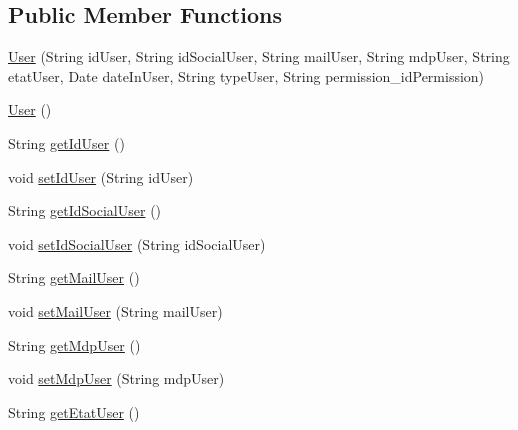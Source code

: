 \subsection*{Public Member Functions}
\begin{DoxyCompactItemize}
\item 
\hyperlink{classcom_1_1ecetech_1_1bti4_1_1itproject_1_1classified_1_1beans_1_1_user_a1c64ba162d05851b1816cdae8f1d2e84}{User} (String id\+User, String id\+Social\+User, String mail\+User, String mdp\+User, String etat\+User, Date date\+In\+User, String type\+User, String permission\+\_\+id\+Permission)
\item 
\hyperlink{classcom_1_1ecetech_1_1bti4_1_1itproject_1_1classified_1_1beans_1_1_user_a5c8183b739fb3263329e53fb5b7cbb04}{User} ()
\item 
String \hyperlink{classcom_1_1ecetech_1_1bti4_1_1itproject_1_1classified_1_1beans_1_1_user_a188f7ab8312cde857251e04343459b90}{get\+Id\+User} ()
\item 
void \hyperlink{classcom_1_1ecetech_1_1bti4_1_1itproject_1_1classified_1_1beans_1_1_user_a4685ee08d69755a377312006de72c863}{set\+Id\+User} (String id\+User)
\item 
String \hyperlink{classcom_1_1ecetech_1_1bti4_1_1itproject_1_1classified_1_1beans_1_1_user_add20572896528d7e7db3e7d45f1dbf0b}{get\+Id\+Social\+User} ()
\item 
void \hyperlink{classcom_1_1ecetech_1_1bti4_1_1itproject_1_1classified_1_1beans_1_1_user_abd30ec28ff6993c845849a551a16c0a4}{set\+Id\+Social\+User} (String id\+Social\+User)
\item 
String \hyperlink{classcom_1_1ecetech_1_1bti4_1_1itproject_1_1classified_1_1beans_1_1_user_a710c0f8322d6797193349a70b24b49c4}{get\+Mail\+User} ()
\item 
void \hyperlink{classcom_1_1ecetech_1_1bti4_1_1itproject_1_1classified_1_1beans_1_1_user_ada9a114c53873caa28f73efddda18b81}{set\+Mail\+User} (String mail\+User)
\item 
String \hyperlink{classcom_1_1ecetech_1_1bti4_1_1itproject_1_1classified_1_1beans_1_1_user_aa93ea4b42a7b37823b336c7a768d03e4}{get\+Mdp\+User} ()
\item 
void \hyperlink{classcom_1_1ecetech_1_1bti4_1_1itproject_1_1classified_1_1beans_1_1_user_ae388a349287394dcc0a2847728aea976}{set\+Mdp\+User} (String mdp\+User)
\item 
String \hyperlink{classcom_1_1ecetech_1_1bti4_1_1itproject_1_1classified_1_1beans_1_1_user_a9792f034523f330304337b924b260fdd}{get\+Etat\+User} ()
\item 

\end{DoxyCompactItemize}

